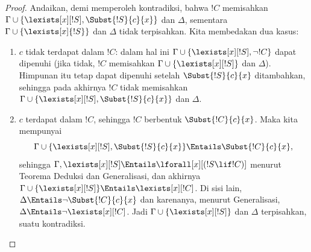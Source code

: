 \documentclass[../../../include/open-logic-section]{subfiles}
\begin{document}
\begin{proof}
Andaikan, demi memperoleh kontradiksi, bahwa $!C$ memisahkan $\Gamma \cup
\{\lexists[x][!S], \Subst{!S}{c}{x}\}$ dan $\Delta$, sementara
$\Gamma \cup \{\lexists[x]{!S} \}$ dan $\Delta$ tidak terpisahkan.
Kita membedakan dua kasus:
\begin{enumerate}
\item $c$ tidak terdapat dalam $!C$: dalam hal ini $\Gamma \cup
  \{\lexists[x][!S], \lnot!C \}$ dapat dipenuhi (jika tidak, $!C$
  memisahkan $\Gamma \cup \{\lexists[x][!S] \}$ dan $\Delta$).
  Himpunan itu tetap dapat dipenuhi setelah $\Subst{!S}{c}{x}$
  ditambahkan, sehingga pada akhirnya $!C$ tidak memisahkan $\Gamma \cup
  \{ \lexists[x][!S], \Subst{!S}{c}{x} \}$ dan $\Delta$.
\item $c$ terdapat dalam $!C$, sehingga $!C$ berbentuk
  $\Subst{!C}{c}{x}$. Maka kita mempunyai
  \[
  \Gamma \cup \{ \lexists[x][!S], \Subst{!S}{c}{x}\} \Entails \Subst{!C}{c}{x},
  \]
  sehingga $\Gamma, \lexists[x][!S] \Entails \lforall[x][(!S \lif !C)]$
  menurut Teorema Deduksi dan Generalisasi, dan akhirnya $\Gamma
  \cup \{ \lexists[x][!S] \} \Entails \lexists[x][!C]$. Di sisi lain,
  $\Delta \Entails \lnot \Subst{!C}{c}{x}$ dan karenanya, menurut
  Generalisasi, $\Delta \Entails \lnot \lexists[x][!C]$. Jadi $\Gamma
  \cup \{\lexists[x][!S] \}$ dan $\Delta$ terpisahkan, suatu
  kontradiksi.
\end{enumerate}
\end{proof}
\end{document}

